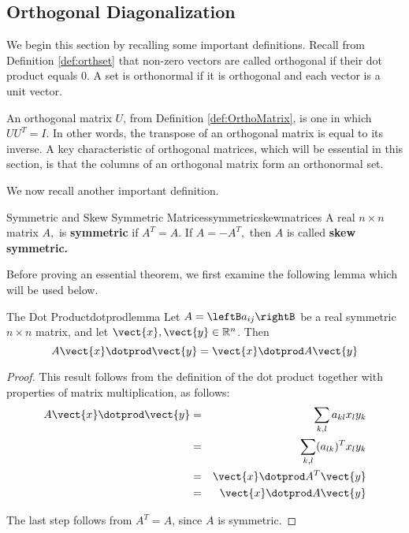 \subsection{Orthogonal Diagonalization}

We begin this section by recalling some important definitions. Recall from Definition \ref{def:orthset} that non-zero vectors are called orthogonal if their dot product equals $0$.  A set is orthonormal if it is orthogonal and each vector is a unit vector. 

An orthogonal matrix $U$, from Definition \ref{def:OrthoMatrix}, is one in which $UU^{T} = I$. In other words, the transpose of an orthogonal matrix is equal to its inverse. A key characteristic of orthogonal matrices, which will be essential in this section, is that the columns of an orthogonal matrix form an orthonormal set. 

We now recall another important definition. 

\begin{definition}{Symmetric and Skew Symmetric Matrices}{symmetricskewmatrices}
A real $n\times n$ matrix $A,$ is \textbf{symmetric }if $A^{T}=A.$ If $%
A=-A^{T},$ then $A$ is called \textbf{skew symmetric. }
\end{definition}

Before proving an essential theorem, we first examine the following lemma which will be used below.

\begin{lemma}{The Dot Product}{dotprodlemma}
Let $A=\leftB a_{ij} \rightB$ be a real symmetric $n \times n$ matrix, and let $\vect{x}, \vect{y} \in \mathbb{R}^n$. Then
\[
A\vect{x} \dotprod \vect{y} = \vect{x} \dotprod A \vect{y}
\]
\end{lemma}

\begin{proof}
This result follows from the definition of the dot product together with properties of matrix multiplication, as follows:
\begin{eqnarray*}
A\vect{x} \dotprod \vect{y} &=& \sum_{k,l}a_{kl}x_{l}y_{k} \\
&=&\sum_{k,l} (a_{lk})^Tx_{l}y_{k} \\
&=& \vect{x}\dotprod A^{T}\vect{y} \\
&=& \vect{x}\dotprod A \vect{y}
\end{eqnarray*}

The last step follows from $A^T = A$, since $A$ is symmetric. 
\end{proof}

